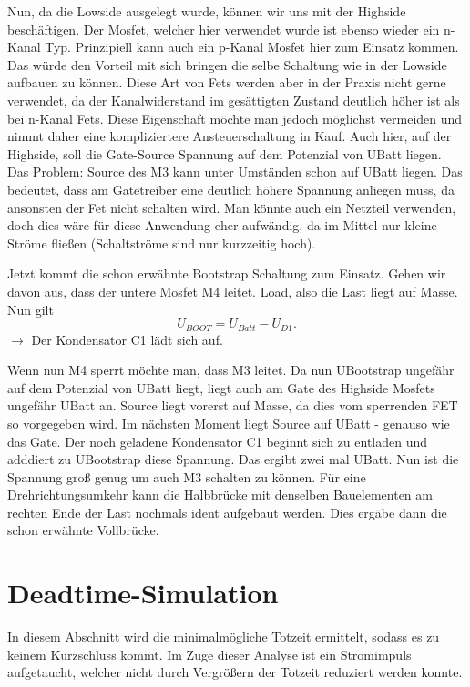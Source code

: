 Nun, da die Lowside ausgelegt wurde, können wir uns mit der Highside beschäftigen. Der Mosfet, welcher hier verwendet wurde ist ebenso wieder ein n-Kanal Typ. Prinzipiell kann auch ein p-Kanal Mosfet hier zum Einsatz kommen. Das würde den Vorteil mit sich bringen die selbe Schaltung wie in der Lowside aufbauen zu können. Diese Art von Fets werden aber in der Praxis nicht gerne verwendet, da der Kanalwiderstand im gesättigten Zustand deutlich höher ist als bei n-Kanal Fets. Diese Eigenschaft möchte man jedoch möglichst vermeiden und nimmt daher eine kompliziertere Ansteuerschaltung in Kauf. Auch hier, auf der Highside, soll die Gate-Source Spannung auf dem Potenzial von UBatt liegen. Das Problem: Source des M3 kann unter Umständen schon auf UBatt liegen. Das bedeutet, dass am Gatetreiber eine deutlich höhere Spannung anliegen muss, da ansonsten der Fet nicht schalten wird. Man könnte auch ein Netzteil verwenden, doch dies wäre für diese Anwendung eher aufwändig, da im Mittel nur kleine Ströme fließen  (Schaltströme sind nur kurzzeitig hoch). 

Jetzt kommt die schon erwähnte Bootstrap Schaltung zum Einsatz. Gehen wir davon aus, dass der untere Mosfet M4 leitet. Load, also die Last liegt auf Masse. Nun gilt 
\begin{equation}
	U_{BOOT}=U_{Batt}-U_{D1}.
\end{equation}
$\rightarrow$ Der Kondensator C1 lädt sich auf.

Wenn nun M4 sperrt möchte man, dass M3 leitet. Da nun UBootstrap ungefähr auf dem Potenzial von UBatt liegt, liegt auch am Gate des Highside Mosfets ungefähr UBatt an. Source liegt vorerst auf Masse, da dies vom sperrenden FET so vorgegeben wird. Im nächsten Moment liegt Source auf UBatt - genauso wie das Gate. Der noch geladene Kondensator C1 beginnt sich zu entladen und adddiert zu UBootstrap diese Spannung. Das ergibt zwei mal UBatt. Nun ist die Spannung groß genug um auch M3 schalten zu können. Für eine Drehrichtungsumkehr kann die Halbbrücke mit denselben Bauelementen am rechten Ende der Last nochmals ident aufgebaut werden. Dies ergäbe dann die schon erwähnte Vollbrücke.

\section{Deadtime-Simulation}
In diesem Abschnitt wird die minimalmögliche Totzeit ermittelt, sodass es zu keinem Kurzschluss kommt. Im Zuge dieser Analyse ist ein Stromimpuls aufgetaucht, welcher nicht durch Vergrößern der Totzeit reduziert werden konnte.
